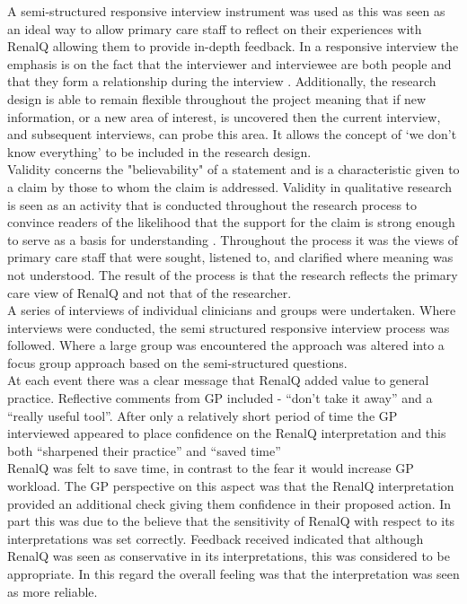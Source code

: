 \documentclass[11pt]{article}
\begin{document}
A semi-structured responsive interview instrument was used as this was seen as an ideal way to allow primary care staff to reflect on their experiences with RenalQ allowing them to provide in-depth feedback. In a responsive interview the emphasis is on the fact that the interviewer and interviewee are both people and that they form a relationship during the interview \citep{rubin2011qualitative}. Additionally, the research design is able to remain flexible throughout the project meaning that if new information, or a new area of interest, is uncovered then the current interview, and subsequent interviews, can probe this area. It allows the concept of ‘we don’t know everything’ to be included in the research design.\\

Validity concerns the "believability" of a statement and is a characteristic given to a claim by those to whom the claim is addressed. Validity in qualitative research is seen as an activity that is conducted throughout the research process \citep{morse2002verification, kvale2009interviews} to convince readers of the likelihood that the support for the claim is strong enough to serve as a basis for understanding \citep{polkinghorne2007validity}. Throughout the process it was the views of primary care staff that were sought, listened to, and clarified where meaning was not understood. The result of the process is that the research reflects the primary care view of RenalQ and not that of the researcher.\\

A series of interviews of individual clinicians and groups were undertaken. Where interviews were conducted, the semi structured responsive interview process was followed. Where a large group was encountered the approach was altered into a focus group approach based on the semi-structured questions.\\

At each event there was a clear message that RenalQ added value to general practice. Reflective comments from GP included - “don’t take it away” and a “really useful tool”. After only a relatively short period of time the GP interviewed appeared to place confidence on the RenalQ interpretation and this both “sharpened their practice” and “saved time”\\

RenalQ was felt to save time, in contrast to the fear it would increase GP workload. The GP perspective on this aspect was that the RenalQ interpretation provided an additional check giving them confidence in their proposed action. In part this was due to the believe that the sensitivity of RenalQ with respect to its interpretations was set correctly. Feedback received indicated that although RenalQ was seen as conservative in its interpretations, this was considered to be appropriate. In this regard the overall feeling was that the interpretation was seen as more reliable.\\
\end{document}
